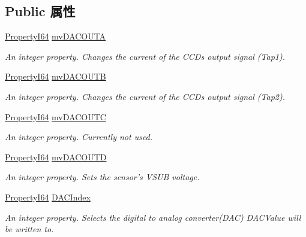 \subsection*{Public 属性}
\begin{DoxyCompactItemize}
\item 
\hyperlink{group___common_interface_ga81749b2696755513663492664a18a893}{Property\+I64} \hyperlink{classmv_i_m_p_a_c_t_1_1acquire_1_1_gen_i_cam_1_1mv_d_a_c_params_a414044d827c38e691569a7ad25d023a7}{mv\+D\+A\+C\+O\+U\+T\+A}
\begin{DoxyCompactList}\small\item\em An integer property. Changes the current of the C\+C\+Ds output signal (Tap1). \end{DoxyCompactList}\item 
\hyperlink{group___common_interface_ga81749b2696755513663492664a18a893}{Property\+I64} \hyperlink{classmv_i_m_p_a_c_t_1_1acquire_1_1_gen_i_cam_1_1mv_d_a_c_params_a48d6d2524caef1b33bf23572aedae3a1}{mv\+D\+A\+C\+O\+U\+T\+B}
\begin{DoxyCompactList}\small\item\em An integer property. Changes the current of the C\+C\+Ds output signal (Tap2). \end{DoxyCompactList}\item 
\hyperlink{group___common_interface_ga81749b2696755513663492664a18a893}{Property\+I64} \hyperlink{classmv_i_m_p_a_c_t_1_1acquire_1_1_gen_i_cam_1_1mv_d_a_c_params_aa5313ae65292dafac588491542aea060}{mv\+D\+A\+C\+O\+U\+T\+C}
\begin{DoxyCompactList}\small\item\em An integer property. Currently not used. \end{DoxyCompactList}\item 
\hyperlink{group___common_interface_ga81749b2696755513663492664a18a893}{Property\+I64} \hyperlink{classmv_i_m_p_a_c_t_1_1acquire_1_1_gen_i_cam_1_1mv_d_a_c_params_a14891b89a4d035ac7313b17d10d6d55c}{mv\+D\+A\+C\+O\+U\+T\+D}
\begin{DoxyCompactList}\small\item\em An integer property. Sets the sensor's V\+S\+U\+B voltage. \end{DoxyCompactList}\item 
\hyperlink{group___common_interface_ga81749b2696755513663492664a18a893}{Property\+I64} \hyperlink{classmv_i_m_p_a_c_t_1_1acquire_1_1_gen_i_cam_1_1mv_d_a_c_params_ad59a8f8a6d548a4905e86ee03d6021a7}{D\+A\+C\+Index}
\begin{DoxyCompactList}\small\item\em An integer property. Selects the digital to analog converter(\+D\+A\+C) D\+A\+C\+Value will be written to. \end{DoxyCompactList}\item 

\end{DoxyCompactItemize}
